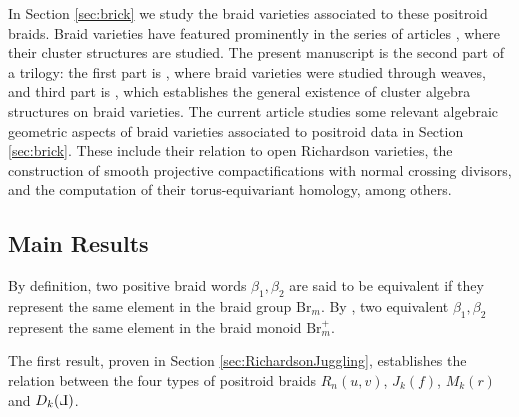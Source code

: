 \documentclass[10pt]{amsart}
\theoremstyle{plain}
\theoremstyle{definition}
\theoremstyle{remark}
\numberwithin{equation}{section}
\newcommand{\Br}{\mathrm{Br}}
\def\Le{\reflectbox{$\mathrm{L}$}}
\begin{document}
In Section \ref{sec:brick} we study the braid varieties associated to these positroid braids. Braid varieties have featured prominently in the series of articles \cite{CGGS,cgglss,glsbs,glsb}, where their cluster structures are studied. The present manuscript is the second part of a trilogy: the first part is \cite{CGGS}, where braid varieties were studied through weaves, and third part is \cite{cgglss}, which establishes the general existence of cluster algebra structures on braid varieties. The current article  studies some relevant algebraic geometric aspects of braid varieties  associated to positroid data in Section \ref{sec:brick}. These include  their relation to open Richardson varieties, the construction of smooth projective compactifications with normal crossing divisors, and the computation of their torus-equivariant homology, among others.

\subsection{Main Results} By definition, two positive braid words $\beta_1,\beta_2$ are said to be equivalent if they represent the same element in the braid group $\Br_m$. By \cite{Garside69}, two equivalent $\beta_1,\beta_2$ represent the same element in the braid monoid $\Br_m^+$.%

\noindent The first result, proven in Section \ref{sec:RichardsonJuggling},  establishes the relation between the four types of positroid braids $R_n(u,v)$, $J_k(f)$, $M_k(r)$ and $D_{k}(\Le)$.
\end{document}
